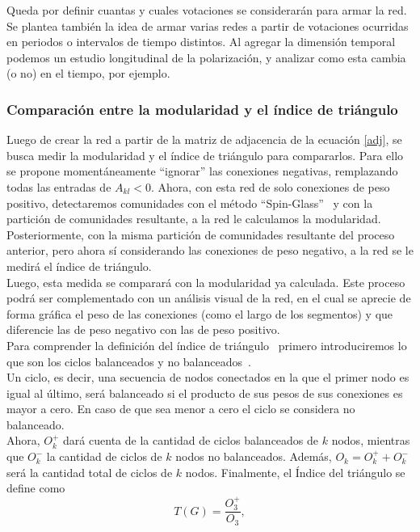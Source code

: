 \documentclass{proyectotesis}
\begin{document}
Queda por definir cuantas y cuales votaciones se considerarán para armar la red. Se plantea también la idea de armar varias redes a partir de votaciones ocurridas en periodos o intervalos de tiempo distintos. Al agregar la dimensión temporal podemos un estudio longitudinal de la polarización, y analizar como esta cambia (o no) en el tiempo, por ejemplo.

\subsubsection{Comparación entre la modularidad y el índice de triángulo} 
Luego de crear la red a partir de la matriz de adjacencia de la ecuación \eqref{adj}, se busca medir la modularidad y el índice de triángulo para compararlos. Para ello se propone momentáneamente ``ignorar'' las conexiones negativas, remplazando todas las entradas de $A_{kl} < 0$. Ahora, con esta red de solo conexiones de peso positivo, detectaremos comunidades con el método ``Spin-Glass''~\cite{reichardt_statistical_2006} y con la partición de comunidades resultante, a la red le calculamos la modularidad. \\

Posteriormente, con la misma partición de comunidades resultante del proceso anterior, pero ahora sí considerando las conexiones de peso negativo, a la red se le medirá el índice de triángulo. \\

Luego, esta medida se comparará con la modularidad ya calculada. Este proceso podrá ser complementado con un análisis visual de la red, en el cual se aprecie de forma gráfica el peso de las conexiones (como el largo de los segmentos) y que diferencie las de peso negativo con las de peso positivo.\\

Para comprender la definición del índice de triángulo~\cite{aref_measuring_2018} primero introduciremos lo que son los ciclos balanceados y no balanceados~\cite{aref_measuring_2018}.\\

Un ciclo, es decir, una secuencia de nodos conectados en la que el primer nodo es igual al último, será balanceado si el producto de sus pesos de sus conexiones es mayor a cero. En caso de que sea menor a cero el ciclo se considera no balanceado.\\

Ahora, $O_k^+$ dará cuenta de la cantidad de ciclos balanceados de $k$ nodos, mientras que $O_k^-$ la cantidad de ciclos de $k$ nodos no balanceados. Además, $O_k = O_k^+ + O_k^-$ será la cantidad total de ciclos de $k$ nodos. Finalmente, el Índice del triángulo se define como
\begin{equation}
    T(G) = \frac{O_3^+}{O_3},
\end{equation}
\end{document}

